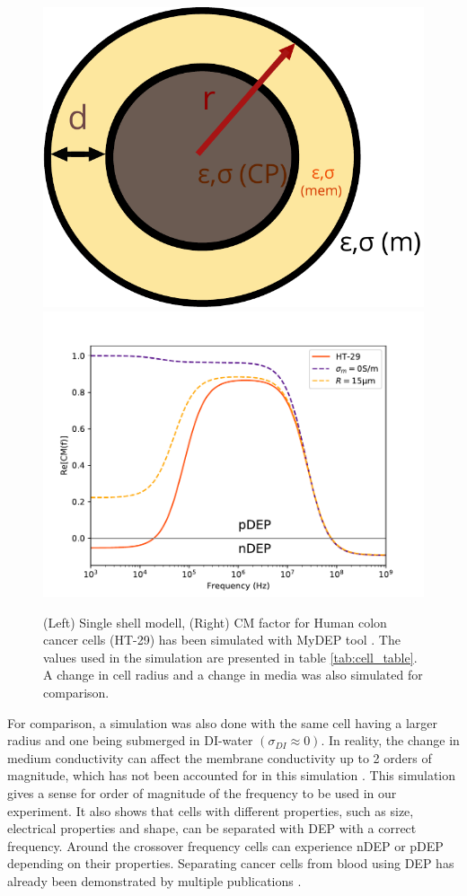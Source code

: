 \documentclass[final]{jyflluk}
\begin{document}
\begin{figure}[h]%
    \centering
    \includegraphics[width=.27\linewidth]{images/single_shell.pdf}\quad\includegraphics[width=.61\linewidth]{images/plot_DEP.pdf}
    \qquad
    \begin{minipage}{1.2in}
    \end{minipage}%
    \caption{(Left) Single shell modell, (Right) CM factor for Human colon cancer cells (HT-29) has been simulated with MyDEP tool \cite{cottet_mydep_2019}. The values used in the simulation are presented in table \ref{tab:cell_table}. A change in cell radius and a change in media was also simulated for comparison.}%
    \label{fig:single_shell}%
\end{figure}


For comparison, a simulation was also done with the same cell having a larger radius and one being submerged in DI-water $(\sigma_{DI}\approx0)$. In reality, the change in medium conductivity can affect the membrane conductivity up to 2 orders of magnitude, which has not been accounted for in this simulation \cite{wu_dielectrophoretic_2012}. This simulation gives a sense for order of magnitude of the frequency to be used in our experiment. It also shows that cells with different properties, such as size, electrical properties and shape, can be separated with DEP with a correct frequency. Around the crossover frequency cells can experience nDEP or pDEP depending on their properties. Separating cancer cells from blood using DEP has already been demonstrated by multiple publications \cite{becker_separation_1995,huang_enrichment_2013,kang_continuous_2006, ivory_direct_2011}.
\end{document}
